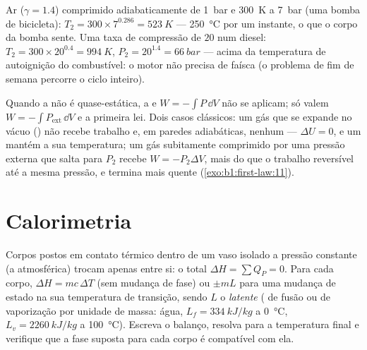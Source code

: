 \begin{example}\label{ex:b1:first-law:diesel}
Ar ($\gamma = 1.4$) comprimido adiabaticamente de \qty{1}{bar} e \qty{300}{K}
a \qty{7}{bar} (uma bomba de bicicleta): $T_2 = 300 \times 7^{0.286} = \qty{523}{K}$
--- \qty{250}{\degreeCelsius} por um instante, o que o corpo da bomba sente.
Uma taxa de compressão de $20$ num diesel: $T_2 = 300 \times 20^{0.4} = \qty{994}{K}$,
$P_2 = 20^{1.4} = \qty{66}{bar}$ --- acima da temperatura de autoignição do
combustível: o motor não precisa de faísca (o problema de fim de semana
percorre o ciclo inteiro).
\end{example}

\begin{remark}\label{rem:b1:first-law:irreversible}
Quando a  não é quase-estática, a  e $W =
-\int P\,\dd V$ não se aplicam; só valem $W = -\int P_{\mathrm{ext}}\,\dd V$ e a
primeira lei. Dois casos clássicos: um gás que se expande no vácuo () não recebe trabalho e, em paredes adiabáticas, nenhum  --- $\Delta U
= 0$, e um  mantém a sua temperatura; um gás subitamente comprimido
por uma pressão externa que salta para $P_2$ recebe $W = -P_2\Delta V$, mais
do que o trabalho reversível até a mesma pressão, e termina mais quente
(\cref{exo:b1:first-law:11}).
\end{remark}

\section{Calorimetria}

\begin{method}\label{met:b1:first-law:calorimetry}
Corpos postos em contato térmico dentro de um vaso isolado a pressão
constante (a atmosférica) trocam  apenas entre si: o total
$\Delta H = \sum Q_P = 0$. Para cada corpo, $\Delta H = mc\,\Delta T$ (sem
mudança de fase) ou $\pm mL$ para uma mudança de estado na sua temperatura
de transição, sendo $L$ o \emph{ latente} ( de fusão ou de
vaporização por unidade de massa: água, $L_f = \qty{334}{kJ/kg}$ a
\qty{0}{\degreeCelsius}, $L_v =
\qty{2260}{kJ/kg}$ a \qty{100}{\degreeCelsius}).
Escreva o balanço, resolva para a temperatura final e verifique que a fase
suposta para cada corpo é compatível com ela.
\end{method}

